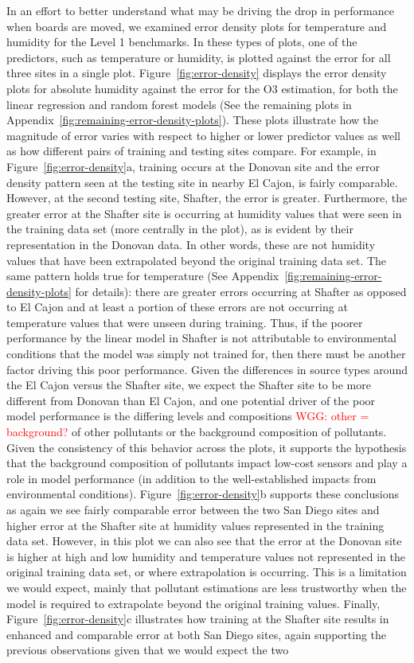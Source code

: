 \documentclass[journal abbreviation, manuscript]{copernicus}
\newcommand\todo[1]{\textcolor{red}{#1}}
\begin{document}
In an effort to better understand what may be driving the drop in performance when boards are moved, we examined error density plots for temperature and humidity for the Level 1 benchmarks. In these types of plots, one of the predictors, such as temperature or humidity, is plotted against the error for all three sites in a single plot.  Figure~\ref{fig:error-density} displays the error density plots for absolute humidity against the error for the O3 estimation, for both the linear regression and random forest models (See the remaining plots in Appendix~\ref{fig:remaining-error-density-plots}). These plots illustrate how the magnitude of error varies with respect to higher or lower predictor values as well as how different pairs of training and testing sites compare. For example, in Figure~\ref{fig:error-density}a, training occurs at the Donovan site and the error density pattern seen at the testing site in nearby El Cajon, is fairly comparable.  However, at the second testing site, Shafter, the error is greater. Furthermore, the greater error at the Shafter site is occurring at humidity values that were seen in the training data set (more centrally in the plot), as is evident by their representation in the Donovan data. In other words, these are not humidity values that have been extrapolated beyond the original training data set. The same pattern holds true for temperature (See Appendix~\ref{fig:remaining-error-density-plots} for details): there are greater errors occurring at Shafter as opposed to El Cajon and at least a portion of these errors are not occurring at temperature values that were unseen during training. Thus, if the poorer performance by the linear model in Shafter is not attributable to environmental conditions that the model was simply not trained for, then there must be another factor driving this poor performance. Given the differences in source types around the El Cajon versus the Shafter site, we expect the Shafter site to be more different from Donovan than El Cajon, and one potential driver of the poor model performance is the differing levels and compositions \todo{WGG: other = background?} of other pollutants or the background composition of pollutants.  Given the consistency of this behavior across the plots, it supports the hypothesis that the background composition of pollutants impact low-cost sensors and play a role in model performance (in addition to the well-established impacts from environmental conditions).  Figure~\ref{fig:error-density}b supports these conclusions as again we see fairly comparable error between the two San Diego sites and higher error at the Shafter site at humidity values represented in the training data set.  However, in this plot we can also see that the error at the Donovan site is higher at high and low humidity and temperature values not represented in the original training data set, or where extrapolation is occurring.  This is a limitation we would expect, mainly that pollutant estimations are less trustworthy when the model is required to extrapolate beyond the original training values. Finally, Figure~\ref{fig:error-density}c illustrates how training at the Shafter site results in enhanced and comparable error at both San Diego sites, again supporting the previous observations given that we would expect the two 
\end{document}
